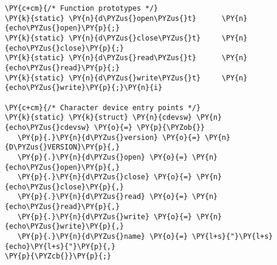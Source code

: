 \begin{Verbatim}[commandchars=\\\{\}]
\PY{c+cm}{/* Function prototypes */}
\PY{k}{static} \PY{n}{d\PYZus{}open\PYZus{}t}      \PY{n}{echo\PYZus{}open}\PY{p}{;}
\PY{k}{static} \PY{n}{d\PYZus{}close\PYZus{}t}     \PY{n}{echo\PYZus{}close}\PY{p}{;}
\PY{k}{static} \PY{n}{d\PYZus{}read\PYZus{}t}      \PY{n}{echo\PYZus{}read}\PY{p}{;}
\PY{k}{static} \PY{n}{d\PYZus{}write\PYZus{}t}     \PY{n}{echo\PYZus{}write}\PY{p}{;}\PY{n}{i}

\PY{c+cm}{/* Character device entry points */}
\PY{k}{static} \PY{k}{struct} \PY{n}{cdevsw} \PY{n}{echo\PYZus{}cdevsw} \PY{o}{=} \PY{p}{\PYZob{}}
   \PY{p}{.}\PY{n}{d\PYZus{}version} \PY{o}{=} \PY{n}{D\PYZus{}VERSION}\PY{p}{,}
   \PY{p}{.}\PY{n}{d\PYZus{}open} \PY{o}{=} \PY{n}{echo\PYZus{}open}\PY{p}{,}
   \PY{p}{.}\PY{n}{d\PYZus{}close} \PY{o}{=} \PY{n}{echo\PYZus{}close}\PY{p}{,}
   \PY{p}{.}\PY{n}{d\PYZus{}read} \PY{o}{=} \PY{n}{echo\PYZus{}read}\PY{p}{,}
   \PY{p}{.}\PY{n}{d\PYZus{}write} \PY{o}{=} \PY{n}{echo\PYZus{}write}\PY{p}{,}
   \PY{p}{.}\PY{n}{d\PYZus{}name} \PY{o}{=} \PY{l+s}{"}\PY{l+s}{echo}\PY{l+s}{"}\PY{p}{,}
\PY{p}{\PYZcb{}}\PY{p}{;}
\end{Verbatim}
